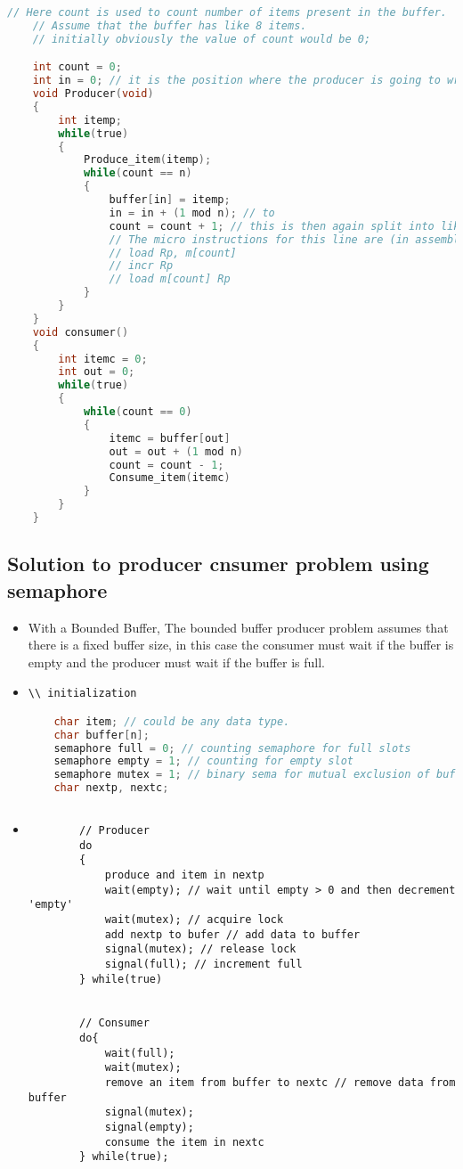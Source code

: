 \documentclass[11pt]{article}
\begin{document}
\begin{lstlisting}[language=C]
	// Here count is used to count number of items present in the buffer. 
	// Assume that the buffer has like 8 items. 
	// initially obviously the value of count would be 0;

	int count = 0;
	int in = 0; // it is the position where the producer is going to write the newly generated data item. 
	void Producer(void)
	{
		int itemp;
		while(true)
		{
			Produce_item(itemp);
			while(count == n)
			{
				buffer[in] = itemp;
				in = in + (1 mod n); // to 
				count = count + 1; // this is then again split into like 3 other commands in assembly. 
				// The micro instructions for this line are (in assembly)
				// load Rp, m[count]
				// incr Rp
				// load m[count] Rp
			}
		}
	}
	void consumer()
	{
		int itemc = 0;
		int out = 0;
		while(true)
		{
			while(count == 0)
			{
				itemc = buffer[out]
				out = out + (1 mod n)
				count = count - 1;
				Consume_item(itemc)
			}
		}
	}
\end{lstlisting}

\subsection{Solution to producer cnsumer problem using semaphore}
\begin{itemize}
	\item With a Bounded Buffer, The bounded buffer producer problem assumes that there is a fixed buffer size, in this case the consumer must wait if the buffer is empty and the producer must wait if the buffer is full.
	\item \begin{lstlisting}[language = C]
	\\ initialization

	char item; // could be any data type. 
	char buffer[n];
	semaphore full = 0; // counting semaphore for full slots
	semaphore empty = 1; // counting for empty slot
	semaphore mutex = 1; // binary sema for mutual exclusion of buffer. 
	char nextp, nextc;
	
	\end{lstlisting}
	
	\item \begin{lstlisting}
		// Producer
		do
		{
			produce and item in nextp
			wait(empty); // wait until empty > 0 and then decrement 'empty'
			wait(mutex); // acquire lock
			add nextp to bufer // add data to buffer
			signal(mutex); // release lock
			signal(full); // increment full
		} while(true)


		// Consumer
		do{
			wait(full);
			wait(mutex);
			remove an item from buffer to nextc // remove data from buffer
			signal(mutex);
			signal(empty);
			consume the item in nextc
		} while(true);
	\end{lstlisting}
\end{itemize}
\end{document}

